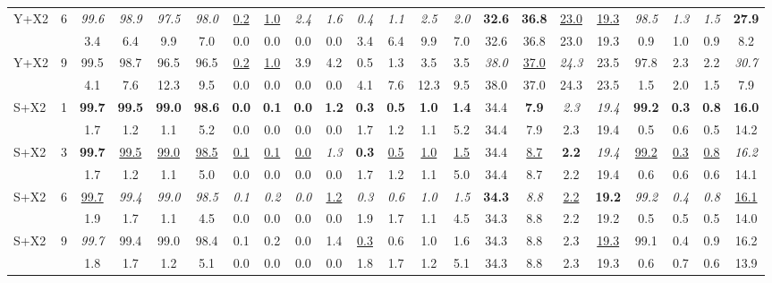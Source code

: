 \documentclass[preprint,12pt]{elsarticle}
\begin{document}
\begin{table}[!htb]
\begin{tabular}{lccccccccccccccccccccc}
\addlinespace
Y+X2 & 6 & \textit{99.6} & \textit{98.9} & \textit{97.5} & \textit{98.0} & \underline{0.2} & \underline{1.0} & \textit{2.4} & \textit{1.6} & \textit{0.4} & \textit{1.1} & \textit{2.5} & \textit{2.0} & \textbf{32.6} & \textbf{36.8} & \underline{23.0} & \underline{19.3} & \textit{98.5} & \textit{1.3} & \textit{1.5} & \textbf{27.9} \\
 &  & 3.4 & 6.4 & 9.9 & 7.0 & 0.0 & 0.0 & 0.0 & 0.0 & 3.4 & 6.4 & 9.9 & 7.0 & 32.6 & 36.8 & 23.0 & 19.3 & 0.9 & 1.0 & 0.9 & 8.2 \\
\addlinespace
\rowcolor{gray!12}
Y+X2 & 9 & 99.5 & 98.7 & 96.5 & 96.5 & \underline{0.2} & \underline{1.0} & 3.9 & 4.2 & 0.5 & 1.3 & 3.5 & 3.5 & \textit{38.0} & \underline{37.0} & \textit{24.3} & 23.5 & 97.8 & 2.3 & 2.2 & \textit{30.7} \\
\rowcolor{gray!12} &  & 4.1 & 7.6 & 12.3 & 9.5 & 0.0 & 0.0 & 0.0 & 0.0 & 4.1 & 7.6 & 12.3 & 9.5 & 38.0 & 37.0 & 24.3 & 23.5 & 1.5 & 2.0 & 1.5 & 7.9 \\
\midrule
S+X2 & 1 & \textbf{99.7} & \textbf{99.5} & \textbf{99.0} & \textbf{98.6} & \textbf{0.0} & \textbf{0.1} & \textbf{0.0} & \textbf{1.2} & \textbf{0.3} & \textbf{0.5} & \textbf{1.0} & \textbf{1.4} & 34.4 & \textbf{7.9} & \textit{2.3} & \textit{19.4} & \textbf{99.2} & \textbf{0.3} & \textbf{0.8} & \textbf{16.0} \\
 &  & 1.7 & 1.2 & 1.1 & 5.2 & 0.0 & 0.0 & 0.0 & 0.0 & 1.7 & 1.2 & 1.1 & 5.2 & 34.4 & 7.9 & 2.3 & 19.4 & 0.5 & 0.6 & 0.5 & 14.2 \\
\addlinespace
\rowcolor{gray!12}
S+X2 & 3 & \textbf{99.7} & \underline{99.5} & \underline{99.0} & \underline{98.5} & \underline{0.1} & \underline{0.1} & \underline{0.0} & \textit{1.3} & \textbf{0.3} & \underline{0.5} & \underline{1.0} & \underline{1.5} & 34.4 & \underline{8.7} & \textbf{2.2} & \textit{19.4} & \underline{99.2} & \underline{0.3} & \underline{0.8} & \textit{16.2} \\
\rowcolor{gray!12} &  & 1.7 & 1.2 & 1.1 & 5.0 & 0.0 & 0.0 & 0.0 & 0.0 & 1.7 & 1.2 & 1.1 & 5.0 & 34.4 & 8.7 & 2.2 & 19.4 & 0.6 & 0.6 & 0.6 & 14.1 \\
\addlinespace
S+X2 & 6 & \underline{99.7} & \textit{99.4} & \textit{99.0} & \textit{98.5} & \textit{0.1} & \textit{0.2} & \textit{0.0} & \underline{1.2} & \textit{0.3} & \textit{0.6} & \textit{1.0} & \textit{1.5} & \textbf{34.3} & \textit{8.8} & \underline{2.2} & \textbf{19.2} & \textit{99.2} & \textit{0.4} & \textit{0.8} & \underline{16.1} \\
 &  & 1.9 & 1.7 & 1.1 & 4.5 & 0.0 & 0.0 & 0.0 & 0.0 & 1.9 & 1.7 & 1.1 & 4.5 & 34.3 & 8.8 & 2.2 & 19.2 & 0.5 & 0.5 & 0.5 & 14.0 \\
\addlinespace
\rowcolor{gray!12}S+X2 & 9 & \textit{99.7} & 99.4 & 99.0 & 98.4 & 0.1 & 0.2 & 0.0 & 1.4 & \underline{0.3} & 0.6 & 1.0 & 1.6 & 34.3 & 8.8 & 2.3 & \underline{19.3} & 99.1 & 0.4 & 0.9 & 16.2 \\
\rowcolor{gray!12} &  & 1.8 & 1.7 & 1.2 & 5.1 & 0.0 & 0.0 & 0.0 & 0.0 & 1.8 & 1.7 & 1.2 & 5.1 & 34.3 & 8.8 & 2.3 & 19.3 & 0.6 & 0.7 & 0.6 & 13.9 \\
\bottomrule
\end{tabular}


\end{table}
\end{document}
